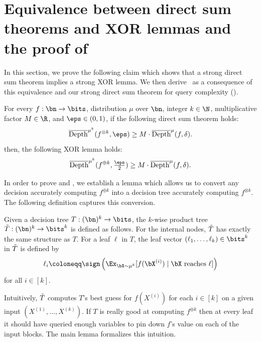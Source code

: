 \section{Equivalence between direct sum theorems and XOR lemmas and the proof of~}

In this section, we prove the following claim which shows that a strong direct sum theorem implies a strong XOR lemma. We then derive~ as a consequence of this equivalence and our strong direct sum theorem for query complexity ().

\begin{claim}
\label{claim:equivalence between direct product and XOR}
For every $f:\bn\to\bits$, distribution $\mu$ over $\bn$, integer $k\in\N$, multiplicative factor $M \in \R$, and $\eps\in (0,1)$, if the following direct sum theorem holds:
$$
\overline{\mathrm{Depth}}^{\mu^k}(f^{\otimes k},\eps)\ge M\cdot\overline{\mathrm{Depth}}^{\mu}(f,\delta).
$$
then, the following XOR lemma holds:
$$
\overline{\mathrm{Depth}}^{\mu^k}(f^{\oplus k},\tfrac{\eps}{2})\ge M\cdot\overline{\mathrm{Depth}}^{\mu}(f,\delta).
$$
\end{claim}

In order to prove  and , we establish a lemma which allows us to convert any decision accurately computing $f^{\oplus k}$ into a decision tree accurately computing $f^{\otimes k}$. The following definition captures this conversion.

\begin{definition}
\label{def:product tree}
    Given a decision tree $T:(\bn)^k \to \bits$, the $k$-wise product tree $\Tilde{T}:(\bn)^k \to \bits^k$ is defined as follows. For the internal nodes, $\Tilde{T}$ has exactly the same structure as $T$. For a leaf $\ell$ in $T$, the leaf vector $(\ell_1,\ldots,\ell_k)\in\bits^k$ in $\Tilde{T}$ is defined by
    $$
    \ell_i\coloneqq\sign\left(\Ex_{\bX\sim\mu^{k}}[f(\bX^{(i)})\mid \bX\text{ reaches }\ell]\right)
    $$
    for all $i\in[k]$.
\end{definition}

Intuitively, $\Tilde{T}$ computes $T$'s best guess for $f(X^{(i)})$ for each $i\in [k]$ on a given input $(X^{(1)},\ldots,X^{(k)})$. If $T$ is really good at computing $f^{\oplus k}$ then at every leaf it should have queried enough variables to pin down $f$'s value on each of the input blocks. The main lemma formalizes this intuition.

